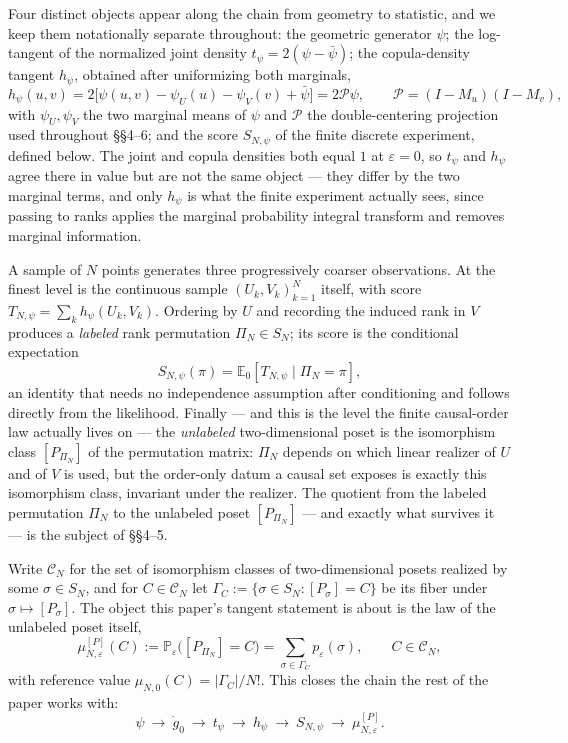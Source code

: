 \documentclass[11pt]{article}
\begin{document}
Four distinct objects appear along the chain from geometry to statistic, and we keep them notationally separate throughout: the geometric generator $\psi$; the log-tangent of the normalized joint density $t_\psi=2(\psi-\bar\psi)$; the copula-density tangent $h_\psi$, obtained after uniformizing both marginals, \[ h_\psi(u,v)=2\big[\psi(u,v)-\psi_U(u)-\psi_V(v)+\bar\psi\big] =2\mathcal P\psi,\qquad \mathcal P=(I-M_u)(I-M_v), \] with $\psi_U,\psi_V$ the two marginal means of $\psi$ and $\mathcal P$ the double-centering projection used throughout \S\S4--6; and the score $S_{N,\psi}$ of the finite discrete experiment, defined below. The joint and copula densities both equal $1$ at $\varepsilon=0$, so $t_\psi$ and $h_\psi$ agree there in value but are not the same object --- they differ by the two marginal terms, and only $h_\psi$ is what the finite experiment actually sees, since passing to ranks applies the marginal probability integral transform and removes marginal information.

A sample of $N$ points generates three progressively coarser observations. At the finest level is the continuous sample $(U_k,V_k)_{k=1}^N$ itself, with score $T_{N,\psi}=\sum_kh_\psi(U_k,V_k)$. Ordering by $U$ and recording the induced rank in $V$ produces a \emph{labeled} rank permutation $\Pi_N\in S_N$; its score is the conditional expectation \[ S_{N,\psi}(\pi)=\mathbb E_0[T_{N,\psi}\mid\Pi_N=\pi], \] an identity that needs no independence assumption after conditioning and follows directly from the likelihood. Finally --- and this is the level the finite causal-order law actually lives on --- the \emph{unlabeled} two-dimensional poset is the isomorphism class $[P_{\Pi_N}]$ of the permutation matrix: $\Pi_N$ depends on which linear realizer of $U$ and of $V$ is used, but the order-only datum a causal set exposes is exactly this isomorphism class, invariant under the realizer. The quotient from the labeled permutation $\Pi_N$ to the unlabeled poset $[P_{\Pi_N}]$ --- and exactly what survives it --- is the subject of \S\S4--5.

Write $\mathcal C_N$ for the set of isomorphism classes of two-dimensional posets realized by some $\sigma\in S_N$, and for $C\in\mathcal C_N$ let $\Gamma_C:=\{\sigma\in S_N:[P_\sigma]=C\}$ be its fiber under $\sigma\mapsto[P_\sigma]$. The object this paper's tangent statement is about is the law of the unlabeled poset itself, \[ \mu_{N,\varepsilon}^{[P]}(C) :=\mathbb P_\varepsilon\big([P_{\Pi_N}]=C\big) =\sum_{\sigma\in\Gamma_C}p_\varepsilon(\sigma), \qquad C\in\mathcal C_N, \] with reference value $\mu_{N,0}(C)=|\Gamma_C|/N!$. This closes the chain the rest of the paper works with: \[ \psi\ \longrightarrow\ \dot g_0\ \longrightarrow\ t_\psi\ \longrightarrow\ h_\psi\ \longrightarrow\ S_{N,\psi}\ \longrightarrow\ \mu_{N,\varepsilon}^{[P]}. \]
\end{document}
